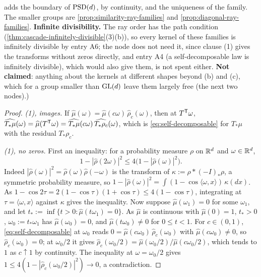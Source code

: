 \begin{proposition}
{adds the boundary of $\mathrm{PSD}(d)$, by continuity, and the uniqueness of the family. The smaller groups
are \ref{prop:similarity-ray-families} and \ref{prop:diagonal-ray-families}. \textbf{Infinite
divisibility.} The ray order has the path condition (\ref{thm:cascade-infinitely-divisible}(3)(b)), so
every kernel of these families is infinitely divisible by entry A6; the node does not need it, since
clause (1) gives the transforms without zeros directly, and entry A4 (a self-decomposable law is
infinitely divisible), which would also give them, is not spent either. \textbf{Not claimed}: anything
about the kernels at different shapes beyond (b) and (c), which for a group smaller than $\mathrm{GL}(d)$ leave
them largely free (the next two nodes).)}
\end{proposition}

\begin{proof}
\leanok
\emph{(1), images.} If $\widehat\mu(\omega) = \widehat\mu(c\omega)\,\widehat\rho_c(\omega)$, then at $T^{\mathsf{T}}\omega$,
$\widehat{T_*\mu}(\omega) = \widehat\mu(T^{\mathsf{T}}\omega) = \widehat{T_*\mu}(c\omega)\,\widehat{T_*\rho_c}(\omega)$, which is
\ref{eq:self-decomposable} for $T_*\mu$ with the residual $T_*\rho_c$.

\emph{(1), no zeros.} First an inequality: for a probability measure $\rho$ on $\mathbb{R}^d$ and $\omega \in \mathbb{R}^d$,
\[
  1 - |\widehat\rho(2\omega)|^2 \le 4\bigl(1 - |\widehat\rho(\omega)|^2\bigr) .
\]
Indeed $|\widehat\rho(\omega)|^2 = \widehat\rho(\omega)\widehat\rho(-\omega)$ is the transform of
$\kappa := \rho * (-I)_*\rho$, a symmetric probability measure, so
$1 - |\widehat\rho(\omega)|^2 = \int(1 - \cos\langle\omega,x\rangle)\,\kappa(dx)$. As
$1 - \cos 2\tau = 2(1 - \cos\tau)(1 + \cos\tau) \le 4(1 - \cos\tau)$, integrating at
$\tau = \langle\omega,x\rangle$ against $\kappa$ gives the inequality. Now suppose
$\widehat\mu(\omega_1) = 0$ for some $\omega_1$, and let $t_* := \inf\{t > 0 : \widehat\mu(t\omega_1) = 0\}$. As $\widehat\mu$
is continuous with $\widehat\mu(0) = 1$, $t_* > 0$, $\omega_0 := t_*\omega_1$ has $\widehat\mu(\omega_0) = 0$, and
$\widehat\mu(t\omega_0) \ne 0$ for $0 \le t < 1$. For $c \in (0,1)$, \ref{eq:self-decomposable} at $\omega_0$ reads
$0 = \widehat\mu(c\omega_0)\,\widehat\rho_c(\omega_0)$ with $\widehat\mu(c\omega_0) \ne 0$, so $\widehat\rho_c(\omega_0) = 0$; at
$\omega_0/2$ it gives $\widehat\rho_c(\omega_0/2) = \widehat\mu(\omega_0/2)/\widehat\mu(c\omega_0/2)$, which tends to $1$ as
$c \uparrow 1$ by continuity. The inequality at $\omega = \omega_0/2$ gives
$1 \le 4(1 - |\widehat\rho_c(\omega_0/2)|^2) \to 0$, a contradiction.


\end{proof}
